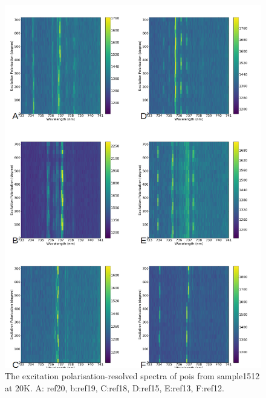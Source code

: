 \begin{figure}[h]
\centering
\includegraphics[width=1\linewidth]{Figures/pic/hydrogenterminationpolarisation}
\caption{The excitation polarisation-resolved spectra of pois from sample1512 at 20K. A: ref20, b:ref19, C:ref18, D:ref15, E:ref13, F:ref12.}
\label{fig:hydrogenterminationpolarisation}
\end{figure}


